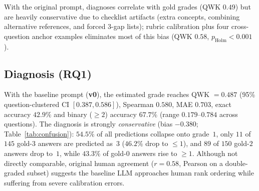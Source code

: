 
With the original prompt, diagnoses correlate with gold grades (QWK $0.49$) but are heavily conservative due to checklist artifacts (extra concepts, combining alternative references, and forced 3-gap lists); rubric calibration plus four cross-question anchor examples eliminates most of this bias (QWK $0.58$, $p_{\text{Holm}}{<}0.001$).

\subsection{Diagnosis (RQ1)}
With the baseline prompt (\textbf{v0}), the estimated grade reaches QWK $=0.487$ (95\% question-clustered CI $[0.387, 0.586]$), Spearman $0.580$, MAE $0.703$, exact accuracy $42.9\%$ and binary ($\ge 2$) accuracy $67.7\%$ (range $0.179$--$0.784$ across questions). The diagnosis is strongly \emph{conservative} (bias $-0.380$; Table~\ref{tab:confusion}): $54.5\%$ of all predictions collapse onto grade~$1$, only $11$ of $145$ gold-$3$ answers are predicted as~$3$ ($46.2\%$ drop to $\le 1$), and $89$ of $150$ gold-$2$ answers drop to~$1$, while $43.3\%$ of gold-$0$ answers rise to $\ge 1$. Although not directly comparable, original human agreement ($r{=}0.58$, Pearson on a double-graded subset) suggests the baseline LLM approaches human rank ordering while suffering from severe calibration errors.

